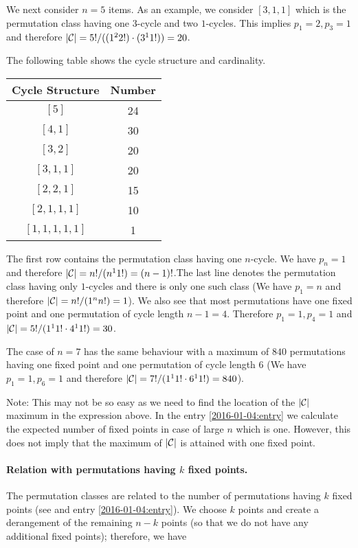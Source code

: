 We next consider $n=5$ items. As an example, we consider $[3,1,1]$ which is the permutation class having one $3$-cycle and two $1$-cycles. This implies $p_1=2, p_3=1$ and therefore $|\mathcal{C}| = 5! / ((1^2 2!) \cdot (3^1 1!)) = 20$. 

The following table shows the cycle structure and cardinality.

\vspace{2mm}

\begin{tabular}{cc}
    Cycle Structure & Number \\ \hline
    $[5]$ &  24 \\
    $[4, 1]$ & 30 \\
    $[3, 2]$ & 20 \\
    $[3, 1, 1]$ & 20 \\
    $[2, 2, 1]$ & 15 \\
    $[2, 1, 1, 1]$ & 10 \\
    $[1, 1, 1, 1, 1]$ & 1
\end{tabular}

\vspace{2mm}

The first row contains the permutation class having one $n$-cycle. We have $p_n=1$ and therefore $|\mathcal{C}| = n!/(n^1 1!) = (n-1)!$.The last line denotes the permutation class having only $1$-cycles and there is only one such class (We have $p_1=n$ and therefore $|\mathcal{C}| = n!/(1^n n!) = 1$). We also see that most permutations have one fixed point and one permutation of cycle length $n-1=4$. Therefore $p_1=1, p_{4}=1$ and $|\mathcal{C}| = 5!/(1^1 1! \cdot 4^1 1! ) = 30$.

The case of $n=7$ has the same behaviour with a maximum of $840$ permutations having one fixed point and one permutation of cycle length $6$ (We have $p_1=1, p_6=1$ and therefore $|\mathcal{C}| = 7!/(1^1 1! \cdot 6^1 1!) = 840$).

Note: This may not be so easy as we need to find the location of the $|\mathcal{C}|$ maximum in the expression above. In the entry \ref{2016-01-04:entry} we calculate the expected number of fixed points in case of large $n$ which is one. However, this does not imply that the maximum of $|\mathcal{C}|$ is attained with one fixed point.


\paragraph{Relation with permutations having $k$ fixed points.} The permutation classes are related to the number of permutations having $k$ fixed points (see \cite{Baez2019} and entry \ref{2016-01-04:entry}). We choose $k$ points and create a derangement of the remaining $n-k$ points (so that we do not have any additional fixed points); therefore, we have

